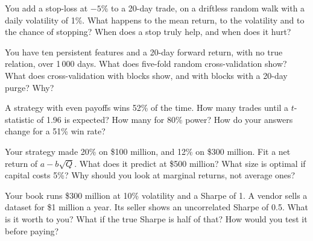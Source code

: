 \begin{question}\label{iq:iv2:research-and-strategy-cases:33}
You add a stop-loss at $-5\%$ to a 20-day trade, on a driftless random walk with a daily volatility of 1\%. What happens to the mean return, to the volatility and to the chance of stopping? When does a stop truly help, and when does it hurt?
\end{question}

\begin{question}\label{iq:iv2:research-and-strategy-cases:34}
You have ten persistent features and a 20-day forward return, with no true relation, over 1\,000 days. What does five-fold random cross-validation show? What does cross-validation with blocks show, and with blocks with a 20-day purge? Why?
\end{question}

\begin{question}\label{iq:iv2:research-and-strategy-cases:35}
A strategy with even payoffs wins 52\% of the time. How many trades until a $t$-statistic of 1.96 is expected? How many for 80\% power? How do your answers change for a 51\% win rate?
\end{question}

\begin{question}\label{iq:iv2:research-and-strategy-cases:36}
Your strategy made 20\% on \$100 million, and 12\% on \$300 million. Fit a net return of $a - b\sqrt{Q}$. What does it predict at \$500 million? What size is optimal if capital costs 5\%? Why should you look at marginal returns, not average ones?
\end{question}

\begin{question}\label{iq:iv2:research-and-strategy-cases:37}
Your book runs \$300 million at 10\% volatility and a Sharpe of 1. A vendor sells a dataset for \$1 million a year. Its seller shows an uncorrelated Sharpe of 0.5. What is it worth to you? What if the true Sharpe is half of that? How would you test it before paying?
\end{question}

